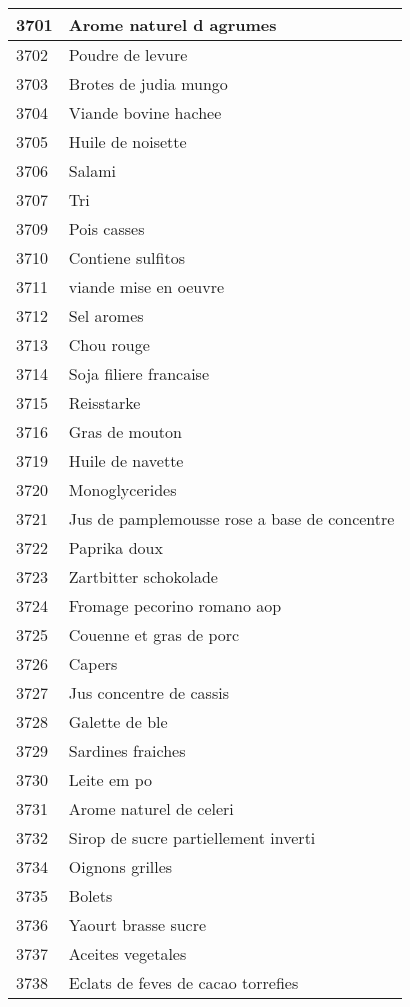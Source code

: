 \begin{longtable}{|l|l|}
3701 & Arome naturel d agrumes \\ \hline 
3702 & Poudre de levure \\ \hline 
3703 & Brotes de judia mungo \\ \hline 
3704 & Viande bovine hachee \\ \hline 
3705 & Huile de noisette \\ \hline 
3706 & Salami \\ \hline 
3707 & Tri \\ \hline 
3709 & Pois casses \\ \hline 
3710 & Contiene sulfitos \\ \hline 
3711 & viande mise en oeuvre \\ \hline 
3712 & Sel aromes \\ \hline 
3713 & Chou rouge \\ \hline 
3714 & Soja filiere francaise \\ \hline 
3715 & Reisstarke \\ \hline 
3716 & Gras de mouton \\ \hline 
3719 & Huile de navette \\ \hline 
3720 & Monoglycerides \\ \hline 
3721 & Jus de pamplemousse rose a base de concentre \\ \hline 
3722 & Paprika doux \\ \hline 
3723 & Zartbitter schokolade \\ \hline 
3724 & Fromage pecorino romano aop \\ \hline 
3725 & Couenne et gras de porc \\ \hline 
3726 & Capers \\ \hline 
3727 & Jus concentre de cassis \\ \hline 
3728 & Galette de ble \\ \hline 
3729 & Sardines fraiches \\ \hline 
3730 & Leite em po \\ \hline 
3731 & Arome naturel de celeri \\ \hline 
3732 & Sirop de sucre partiellement inverti \\ \hline 
3734 & Oignons grilles \\ \hline 
3735 & Bolets \\ \hline 
3736 & Yaourt brasse sucre \\ \hline 
3737 & Aceites vegetales \\ \hline 
3738 & Eclats de feves de cacao torrefies \\ \hline 

\end{longtable}
